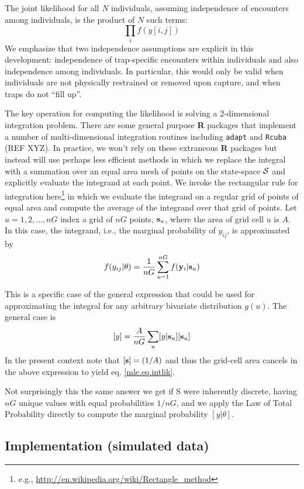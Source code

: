 The joint likelihood for all $N$ individuals, assuming independence of
encounters among individuals, is the product of $N$ such terms:
\[
          \prod_{i}  f(y[i,j])
\]
We emphasize that two independence assumptions are explicit in this
development: independence of trap-specific encounters within
individuals and also independence among individuals. In particular,
this would only be valid when individuals are not physically
restrained or removed upon capture, and when traps do not ``fill up''.

The key operation for computing the likelihood is solving a
2-dimensional integration problem. There are some general purpose {\bf
  R} packages that implement a number of 
 multi-dimensional integration routines
including \mbox{\tt adapt} \citep{genz_etal:2007} and \mbox{\tt Rcuba} (REF XYZ). In practice, we won’t rely
on these extraneous {\bf R} packages but instead will use perhaps less
efficient methods in which we replace the integral with a summation
over an equal area mesh of points on the state-space ${\cal S}$ and explicitly
evaluate the integrand at each point. We invoke the rectangular rule
for integration here\footnote{e.g., 
\url{http://en.wikipedia.org/wiki/Rectangle_method}
} in which we
evaluate the
integrand on a regular grid of points of equal area and compute the
average of
the integrand over that grid of points. 
Let $u=1,2,\ldots,nG$ index a grid of
$nG$ points, ${\bf s}_{u}$,  where the area of grid cell $u$ is $A$.
In this case, the integrand, i.e., the marginal probability of
$y_{ij}$, is approximated by  
\begin{equation}
          f(y_{ij}|\theta) = \frac{1}{nG} \sum_{u=1}^{nG}  f( {\bold
            y}_{i} |{\bf s}_u)
\label{mle.eq.intlik}
\end{equation}

This is a specific case of the general expression that could be used
for approximating the integral for any arbitrary bivariate
distribution $g(u)$. The general case is
\[
[y]  = \frac{A}{nG} \sum_{u} [y|{\bf s}_{u}] [{\bf s}_{u}]
\]
 In the present context note that $[{\bf s}] = (1/A)$
and thus the grid-cell area cancels in the above
expression to yield eq. \ref{mle.eq.intlik}.

Not surprisingly this the same answer we get if {\cal S} were inherently
discrete, having $nG$ unique values with equal probabilities $1/nG$,
and we apply the Law of Total Probability directly to compute the
marginal probability  $[y|\theta]$.


\subsection{ Implementation (simulated data)}

